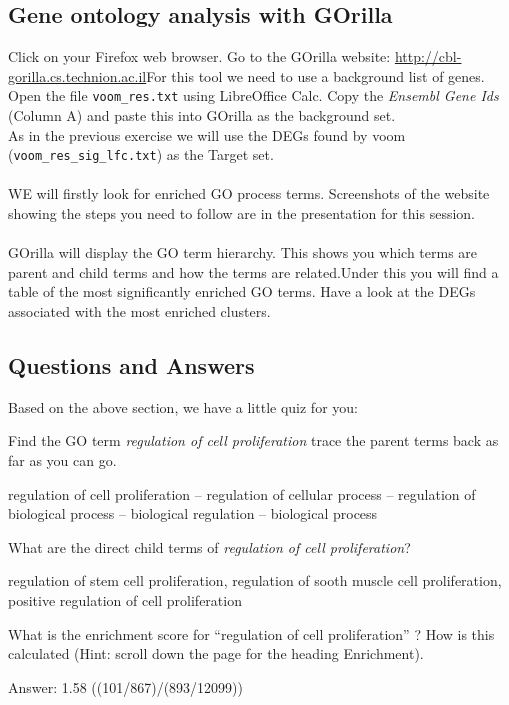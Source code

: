 \subsection{Gene ontology analysis with GOrilla}

Click on your Firefox web browser.  Go to the GOrilla website: \url{http://cbl-gorilla.cs.technion.ac.il}For this tool we need to use a background list of genes. Open the file \texttt{voom\_res.txt} using LibreOffice Calc.  Copy the \emph{Ensembl Gene Ids} (Column A) and paste this into GOrilla as the background set.\\As in the previous exercise we will use the DEGs found by voom (\texttt{voom\_res\_sig\_lfc.txt}) as the Target set. \\\\WE will firstly look for enriched GO process terms.  Screenshots of the website showing the steps you need to follow are in the presentation for this session.\\\\GOrilla will display the GO term hierarchy. This shows you which terms are parent and child terms and how the terms are related.Under this you will find a table of the most significantly enriched GO terms.  Have a look at the DEGs associated with the most enriched clusters.

\subsection{Questions and Answers}
Based on the above section, we have a little quiz for you:
\begin{questions}
Find the GO term \emph{regulation of cell proliferation} trace the parent terms back as far as you can go. 
\begin{answer}
regulation of cell proliferation – regulation of cellular process – regulation of biological process – biological regulation – biological process
\end{answer}
What are the direct child terms of \emph{regulation of cell proliferation}?
\begin{answer}
regulation of stem cell proliferation, regulation of sooth muscle cell proliferation, positive regulation of cell proliferation
\end{answer}
What is the enrichment score for “regulation of cell proliferation” ? How is this calculated (Hint: scroll down the page for the heading Enrichment). 
\begin{answer}
Answer: 1.58 ((101/867)/(893/12099))
\end{answer}
\end{questions}
